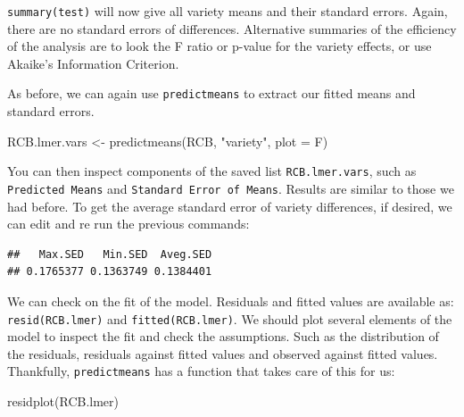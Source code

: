 \documentclass[
]{book}
\newenvironment{Shaded}{\begin{snugshade}}{\end{snugshade}}
\newcommand{\AttributeTok}[1]{\textcolor[rgb]{0.77,0.63,0.00}{#1}}
\newcommand{\FunctionTok}[1]{\textcolor[rgb]{0.00,0.00,0.00}{#1}}
\newcommand{\NormalTok}[1]{#1}
\newcommand{\OtherTok}[1]{\textcolor[rgb]{0.56,0.35,0.01}{#1}}
\newcommand{\SpecialCharTok}[1]{\textcolor[rgb]{0.00,0.00,0.00}{#1}}
\newcommand{\StringTok}[1]{\textcolor[rgb]{0.31,0.60,0.02}{#1}}
\begin{document}
\texttt{summary(test)} will now give all variety means and their standard errors. Again, there are no standard errors of differences. Alternative summaries of the efficiency of the analysis are to look the F ratio or p-value for the variety effects, or use Akaike's Information Criterion.

As before, we can again use \texttt{predictmeans} to extract our fitted means and standard errors.

\begin{Shaded}
\begin{Highlighting}[]
\NormalTok{RCB.lmer.vars }\OtherTok{\textless{}{-}} \FunctionTok{predictmeans}\NormalTok{(RCB, }\StringTok{"variety"}\NormalTok{, }\AttributeTok{plot =}\NormalTok{ F)}
\end{Highlighting}
\end{Shaded}

You can then inspect components of the saved list \texttt{RCB.lmer.vars}, such as \texttt{Predicted\ Means} and \texttt{Standard\ Error\ of\ Means}. Results are similar to those we had before. To get the average standard error of variety differences, if desired, we can edit and re run the previous commands:

\begin{Shaded}
\end{Shaded}

\begin{verbatim}
##   Max.SED   Min.SED  Aveg.SED 
## 0.1765377 0.1363749 0.1384401
\end{verbatim}

We can check on the fit of the model. Residuals and fitted values are available as:
\texttt{resid(RCB.lmer)} and \texttt{fitted(RCB.lmer)}. We should plot several elements of the model to inspect the fit and check the assumptions. Such as the distribution of the residuals, residuals against fitted values and observed against fitted values. Thankfully, \texttt{predictmeans} has a function that takes care of this for us:

\begin{Shaded}
\begin{Highlighting}[]
\FunctionTok{residplot}\NormalTok{(RCB.lmer)}
\end{Highlighting}
\end{Shaded}
\end{document}
